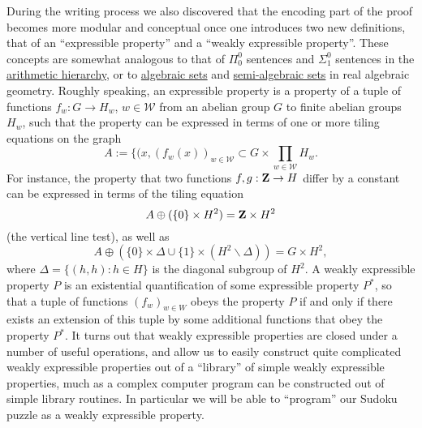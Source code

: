 \documentclass[11pt]{article}
\theoremstyle{definition}
\theoremstyle{remark}
\begin{document}
During the writing process we also discovered that the encoding part of the proof becomes more modular and conceptual once one introduces two new definitions, that of an “expressible property” and a “weakly expressible property”. These concepts are somewhat analogous to that of \({\Pi^0_0}\) sentences and \({\Sigma^0_1}\) sentences in the \href{https://en.wikipedia.org/wiki/Arithmetical_hierarchy}{arithmetic hierarchy}, or to \href{https://en.wikipedia.org/wiki/Algebraic_variety}{algebraic sets} and \href{https://en.wikipedia.org/wiki/Semialgebraic_set}{semi-algebraic sets} in real algebraic geometry. Roughly speaking, an expressible property is a property of a tuple of functions \({f_w: G \rightarrow H_w}\), \({w \in {\mathcal W}}\) from an abelian group \({G}\) to finite abelian groups \({H_w}\), such that the property can be expressed in terms of one or more tiling equations on the graph \[\displaystyle  A := \{ (x, (f_w(x))_{w \in {\mathcal W}} \subset G \times \prod_{w \in {\mathcal W}} H_w.\]
 For instance, the property that two functions \({f,g: {\bf Z} \rightarrow H}\) differ by a constant can be expressed in terms of the tiling equation \[\displaystyle  A \oplus (\{0\} \times H^2) = {\bf Z} \times H^2\]
 (the vertical line test), as well as \[\displaystyle  A \oplus (\{0\} \times \Delta \cup \{1\} \times (H^2 \backslash \Delta)) = G \times H^2,\]
 where \({\Delta = \{ (h,h): h \in H \}}\) is the diagonal subgroup of \({H^2}\). A weakly expressible property \({P}\) is an existential quantification of some expressible property \({P^*}\), so that a tuple of functions \({(f_w)_{w \in W}}\) obeys the property \({P}\) if and only if there exists an extension of this tuple by some additional functions that obey the property \({P^*}\). It turns out that weakly expressible properties are closed under a number of useful operations, and allow us to easily construct quite complicated weakly expressible properties out of a “library” of simple weakly expressible properties, much as a complex computer program can be constructed out of simple library routines. In particular we will be able to “program” our Sudoku puzzle as a weakly expressible property.

 
\end{document}
